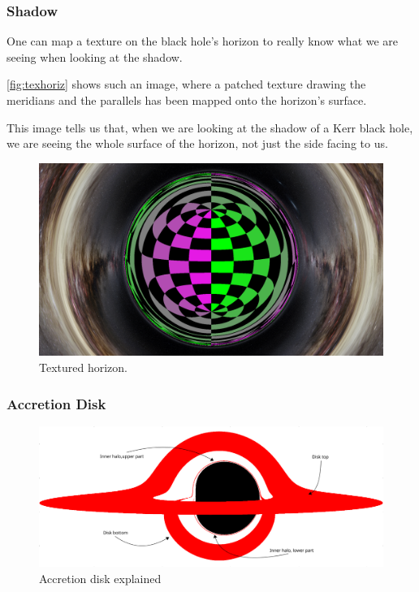 \subsubsection*{Shadow}

One can map a texture on the black hole's horizon to really know what we are seeing when looking at the shadow.

\autoref{fig:texhoriz} shows such an image, where a patched texture drawing the meridians and the parallels has been mapped onto the horizon's surface.

This image tells us that, when we are looking at the shadow of a Kerr black hole, we are seeing the whole surface of the horizon, not just the side facing to us.

\begin{figure}[bth]
	\myfloatalign
	\includegraphics[width=.8\linewidth]{gfx/gridhorizon}
	\caption[Textured horizon]{Textured horizon.}
	\label{fig:texhoriz}
\end{figure}

\subsubsection*{Accretion Disk}

\begin{figure}[bth]
	\myfloatalign
	\includegraphics[width=\linewidth]{gfx/bh_simple}
	\caption[Accretion disk explained]{Accretion disk explained}
	\label{fig:explanation}
\end{figure}

